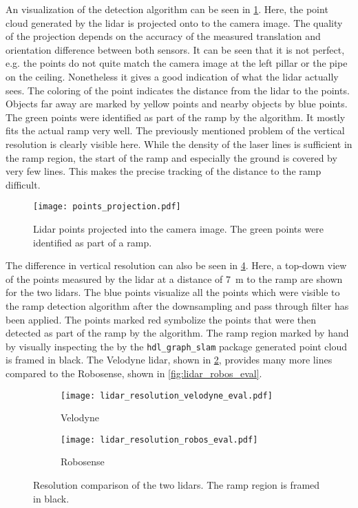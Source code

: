An visualization of the detection algorithm can be seen in \cref{fig:points_projection}.
Here, the point cloud generated by the \gls{lidar} is projected onto to the camera image.
The quality of the projection depends on the accuracy of the measured translation and orientation difference between both sensors.
It can be seen that it is not perfect, e.g. the points do not quite match the camera image at the left pillar or the pipe on the ceiling.
Nonetheless it gives a good indication of what the \gls{lidar} actually sees.
The coloring of the point indicates the distance from the \gls{lidar} to the points.
Objects far away are marked by yellow points and nearby objects by blue points.
The green points were identified as part of the ramp by the algorithm.
It mostly fits the actual ramp very well.
The previously mentioned problem of the vertical resolution is clearly visible here.
While the density of the laser lines is sufficient in the ramp region, the start of the ramp and especially the ground is covered by very few lines.
This makes the precise tracking of the distance to the ramp difficult.
\begin{figure}[htbp]
	\centering
	\texttt{[image: points\_projection.pdf]}
	\caption{Lidar points projected into the camera image. The green points were identified as part of a ramp.}
	\label{fig:points_projection}
\end{figure}
The difference in vertical resolution can also be seen in \cref{fig:lidar_resolution_eval}.
Here, a top-down view of the points measured by the \gls{lidar} at a distance of \SI{7}{\metre} to the ramp are shown for the two \gls{lidar}s.
The blue points visualize all the points which were visible to the ramp detection algorithm after the downsampling and pass through filter has been applied.
The points marked red symbolize the points that were then detected as part of the ramp by the algorithm.
The ramp region marked by hand by visually inspecting the by the \texttt{hdl\_graph\_slam} package generated point cloud is framed in black.
The Velodyne \gls{lidar}, shown in \cref{fig:lidar_resolution_velodyne_eval}, provides many more lines compared to the Robosense, shown in \cref{fig:lidar_robos_eval}.


\begin{figure}[htbp]
	\centering
	\begin{subfigure}{1\textwidth}
		\centering
		\texttt{[image: lidar\_resolution\_velodyne\_eval.pdf]}
		\caption{Velodyne}
		\label{fig:lidar_resolution_velodyne_eval}
	\end{subfigure}
	
	\begin{subfigure}{1\textwidth}
		\centering
		\texttt{[image: lidar\_resolution\_robos\_eval.pdf]}
		\caption{Robosense}
		\label{fig:lidar_resolution_robos_eval}
	\end{subfigure}
	\caption{Resolution comparison of the two \gls{lidar}s. The ramp region is framed in black.}
	\label{fig:lidar_resolution_eval}
\end{figure}
